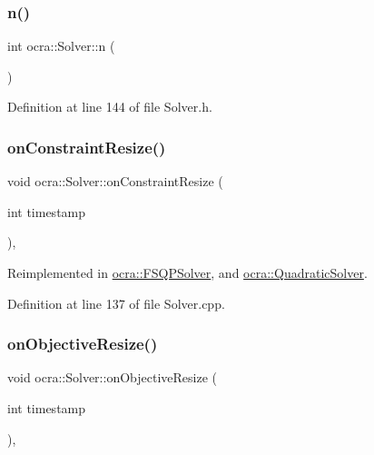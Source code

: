 \subsubsection{\texorpdfstring{n()}{n()}}
{\footnotesize\ttfamily int ocra\+::\+Solver\+::n (\begin{DoxyParamCaption}{ }\end{DoxyParamCaption})\hspace{0.3cm}{\ttfamily [inline]}}



Definition at line 144 of file Solver.\+h.

\hypertarget{classocra_1_1Solver_ad74c2f36dcee107636675bb6ff16e26a}{}\label{classocra_1_1Solver_ad74c2f36dcee107636675bb6ff16e26a} 
\subsubsection{\texorpdfstring{on\+Constraint\+Resize()}{onConstraintResize()}}
{\footnotesize\ttfamily void ocra\+::\+Solver\+::on\+Constraint\+Resize (\begin{DoxyParamCaption}\item[{int}]{timestamp }\end{DoxyParamCaption})\hspace{0.3cm}{\ttfamily [protected]}, {\ttfamily [virtual]}}



Reimplemented in \hyperlink{classocra_1_1FSQPSolver_a4bee18cc63de9aabefe747e052662351}{ocra\+::\+F\+S\+Q\+P\+Solver}, and \hyperlink{classocra_1_1QuadraticSolver_aea64c3c099130835a5f42051921a0b6d}{ocra\+::\+Quadratic\+Solver}.



Definition at line 137 of file Solver.\+cpp.

\hypertarget{classocra_1_1Solver_a7d45f67599edfa5ba8373b115378de5c}{}\label{classocra_1_1Solver_a7d45f67599edfa5ba8373b115378de5c} 
\subsubsection{\texorpdfstring{on\+Objective\+Resize()}{onObjectiveResize()}}
{\footnotesize\ttfamily void ocra\+::\+Solver\+::on\+Objective\+Resize (\begin{DoxyParamCaption}\item[{int}]{timestamp }\end{DoxyParamCaption})\hspace{0.3cm}{\ttfamily [protected]}, {\ttfamily [virtual]}}



